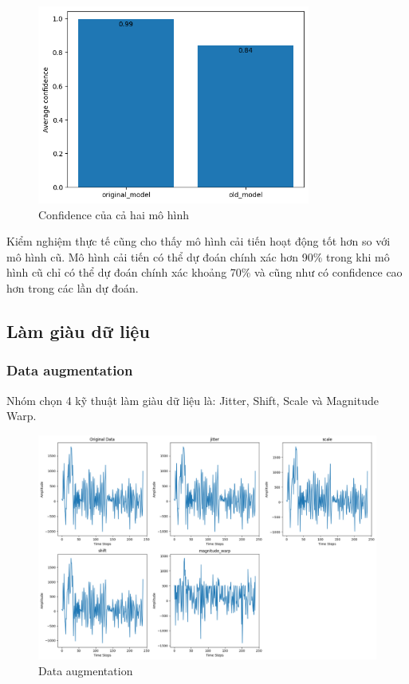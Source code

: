 \begin{figure}[H]
    \centering
    \includegraphics[width=0.8\textwidth]{Images/Improvement results/old_new_confidence.png}
    \caption{Confidence của cả hai mô hình}
    \label{fig:confidence_model}
\end{figure}

Kiểm nghiệm thực tế cũng cho thấy mô hình cải tiến hoạt động tốt hơn so với mô hình cũ. Mô hình cải tiến có thể dự đoán chính xác hơn 90\%  trong khi mô hình cũ chỉ có thể dự đoán chính xác khoảng 70\% và cũng như có confidence cao hơn trong các lần dự đoán.

\subsection{Làm giàu dữ liệu}
\subsubsection{Data augmentation}
Nhóm chọn 4 kỹ thuật làm giàu dữ liệu là: Jitter, Shift, Scale và Magnitude Warp.

\begin{figure}[H]
    \centering
    \includegraphics[width=1\textwidth]{Images/Improvement results/data_augmentation.png}
    \caption{Data augmentation}
    \label{fig:data_augmentation}
\end{figure}

